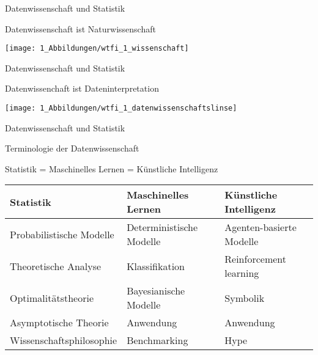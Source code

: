 \documentclass[
  8pt,
  ignorenonframetext,
]{beamer}
\begin{document}
\begin{frame}{Datenwissenschaft und Statistik}
\protect\hypertarget{datenwissenschaft-und-statistik-3}{}
\Large

Datenwissenschaft ist Naturwissenschaft \vspace{3mm}

\begin{center}\texttt{[image: 1\_Abbildungen/wtfi\_1\_wissenschaft]} \end{center}
\end{frame}

\begin{frame}{Datenwissenschaft und Statistik}
\protect\hypertarget{datenwissenschaft-und-statistik-4}{}
\Large

Datenwissenchaft ist Dateninterpretation \center \vspace{.5cm}

\begin{center}\texttt{[image: 1\_Abbildungen/wtfi\_1\_datenwissenschaftslinse]} \end{center}
\end{frame}

\begin{frame}{Datenwissenschaft und Statistik}
\protect\hypertarget{datenwissenschaft-und-statistik-5}{}
\Large

Terminologie der Datenwissenschaft \vspace{.5cm}

\center

Statistik = Maschinelles Lernen = Künstliche Intelligenz \vspace{.5cm}

\small
\renewcommand{\arraystretch}{1.5}
\begin{tabular}{l|l|l}

Statistik                   & Maschinelles Lernen       & Künstliche Intelligenz        \\\hline
Probabilistische Modelle    & Deterministische Modelle  & Agenten-basierte Modelle      \\
Theoretische Analyse        & Klassifikation            & Reinforcement learning        \\
Optimalitätstheorie         & Bayesianische Modelle     & Symbolik                      \\
Asymptotische Theorie       & Anwendung                 & Anwendung                     \\
Wissenschaftsphilosophie    & Benchmarking              & Hype                          \\
\end{tabular}
\end{frame}
\end{document}
